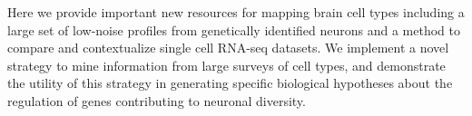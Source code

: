 Here we provide important new resources for mapping brain cell types including a large set of low-noise profiles from genetically identified neurons and a method to compare and contextualize single cell RNA-seq datasets. We implement a novel strategy to mine information from large surveys of cell types, and demonstrate the utility of this strategy in generating specific biological hypotheses about the regulation of genes contributing to neuronal diversity.










